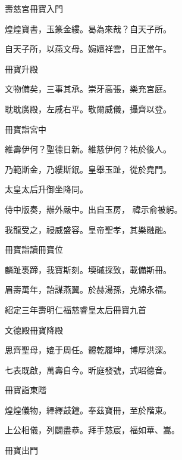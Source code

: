 \begin{pinyinscope}
 壽慈宮冊寶入門



 煌煌寶書，玉篆金縷。曷為來哉？自天子所。



 自天子所，以燕文母。婉嬗祥雲，日正當午。



 冊寶升殿



 文物備矣，三事其承。崇牙高張，樂充宮庭。



 耽耽廣殿，左戚右平。敬爾威儀，攝齊以登。



 冊寶詣宮中



 維壽伊何？聖德日新。維慈伊何？祐於後人。



 乃範斯金，乃縷斯鈱。皇舉玉趾，從於堯門。



 太皇太后升御坐降同。



 侍中版奏，辦外嚴中。出自玉房，
 禕示俞被躬。



 我龍受之，祲威盛容。皇帝聖孝，其樂融融。



 冊寶詣讀冊寶位



 麟趾褭蹄，我寶斯刻。堧磩採致，載備斯冊。



 眉壽萬年，詒謀燕翼。於赫湯孫，克綿永福。



 紹定三年壽明仁福慈睿皇太后冊寶九首



 文德殿冊寶降殿



 思齊聖母，媲于周任。體乾履坤，博厚洪深。



 七表既啟，萬壽自今。昕庭發號，式昭德音。



 冊寶詣東階



 煌煌儀物，繹繹鼓鐘。奉茲寶冊，至於階東。



 上公相儀，列闢盡恭。拜手慈宸，福如華、嵩。



 冊寶出門




\end{pinyinscope}
